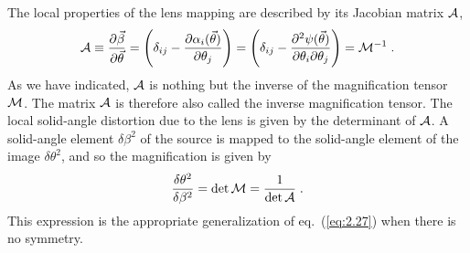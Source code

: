 \documentclass[a4paper,10pt]{article} %
\begin{document}
The local properties of the lens mapping are described by its Jacobian
matrix ${\cal A}$,
\begin{equation}
  {\cal A} \equiv \frac{\partial\vec\beta}{\partial\vec\theta} =
  \left(\delta_{ij} -
  \frac{\partial\alpha_i(\vec\theta)}{\partial\theta_j}\right) =
  \left(\delta_{ij} - \frac{\partial^2\psi(\vec\theta)}
  {\partial\theta_i\partial\theta_j}\right) = {\cal M}^{-1} \;.
\label{eq:3.16}
\end{equation}
As we have indicated, ${\cal A}$ is nothing but the inverse of the
magnification tensor ${\cal M}$. The matrix ${\cal A}$ is therefore
also called the inverse magnification tensor. The local solid-angle
distortion due to the lens is given by the determinant of ${\cal
A}$. A solid-angle element $\delta\beta^2$ of the source is mapped to
the solid-angle element of the image $\delta\theta^2$, and so the
magnification is given by
\begin{equation}
  \frac{\delta\theta^2}{\delta\beta^2} = \det{\cal M} =
  \frac{1}{\det{\cal A}}\;.
\label{eq:3.17}
\end{equation}
This expression is the appropriate generalization of eq.\
(\ref{eq:2.27}) when there is no symmetry.
\end{document}

